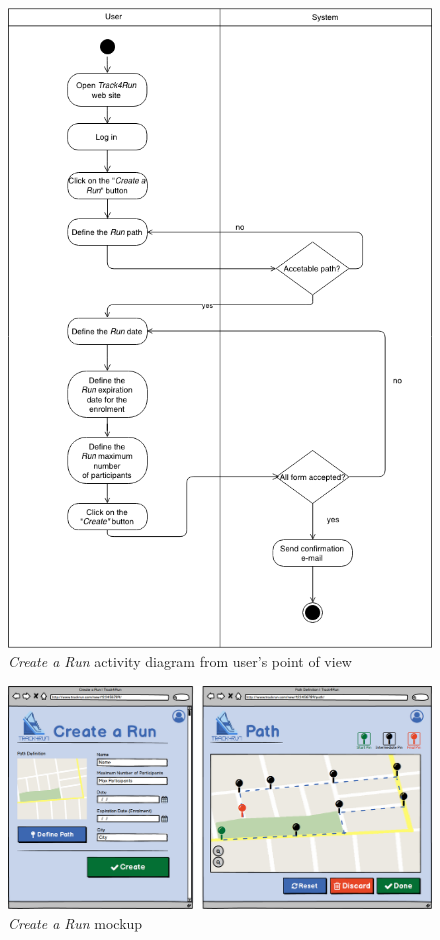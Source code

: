 \begin{figure}[H]
\begin{center}
  \includegraphics[height=0.6\paperheight]{img/activity/CreateRun.png}
  \hspace{0.05\linewidth}
  \centering
  \caption{\textit{Create a Run} activity diagram from user's point of view}
  \label{img:createRunActivityDiagram}
\end{center}
\end{figure}

\begin{figure}[H]
\begin{center}
  \includegraphics[width=\textwidth]{img/mockup/CreateRun.png}
  \hspace{0.05\linewidth}
  \centering
  \caption{\textit{Create a Run} mockup}
  \label{img:createRunMockup}
\end{center}
\end{figure}
